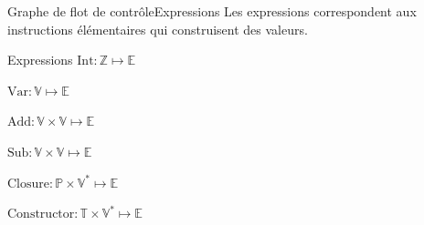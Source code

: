 \documentclass{beamer}
\begin{document}
\begin{frame}{Graphe de flot de contrôle}{Expressions}
    Les expressions correspondent aux instructions élémentaires qui construisent des valeurs.
    
    \begin{block}{Expressions}
        $\text{Int} : \mathbb{Z} \mapsto \mathbb{E}$%

        $\text{Var} : \mathbb{V} \mapsto \mathbb{E}$%

        $\text{Add} : \mathbb{V} \times \mathbb{V} \mapsto \mathbb{E}$%

        $\text{Sub} : \mathbb{V} \times \mathbb{V} \mapsto \mathbb{E}$%

        $\text{Closure} : \mathbb{P} \times \mathbb{V}^{*} \mapsto \mathbb{E}$%

        $\text{Constructor} : \mathbb{T} \times \mathbb{V}^{*} \mapsto \mathbb{E}$%
    \end{block}
\end{frame}
\end{document}
